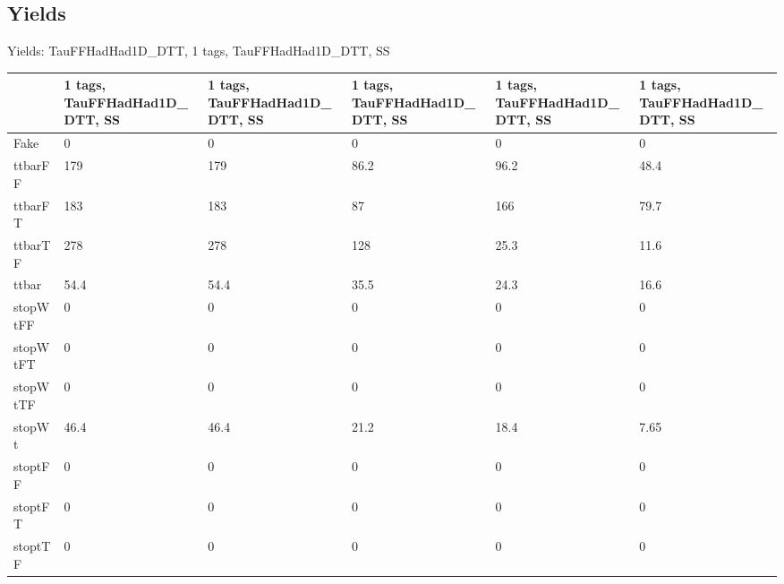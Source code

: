 
\subsection{Yields}

\begin{frame}{Yields: TauFFHadHad1D\_DTT, 1 tags, TauFFHadHad1D\_DTT, SS}
\begin{center}
  \begin{tabular}{l| >{\centering\let\newline\\\arraybackslash\hspace{0pt}}m{1.4cm}| >{\centering\let\newline\\\arraybackslash\hspace{0pt}}m{1.4cm}| >{\centering\let\newline\\\arraybackslash\hspace{0pt}}m{1.4cm}| >{\centering\let\newline\\\arraybackslash\hspace{0pt}}m{1.4cm}| >{\centering\let\newline\\\arraybackslash\hspace{0pt}}m{1.4cm}}
    & 1 tags, TauFFHadHad1D\_DTT, SS & 1 tags, TauFFHadHad1D\_DTT, SS & 1 tags, TauFFHadHad1D\_DTT, SS & 1 tags, TauFFHadHad1D\_DTT, SS & 1 tags, TauFFHadHad1D\_DTT, SS \\
 \hline \hline
    Fake& 0 & 0 & 0 & 0 & 0 \\
 \hline
    ttbarFF& 179 & 179 & 86.2 & 96.2 & 48.4 \\
 \hline
    ttbarFT& 183 & 183 & 87 & 166 & 79.7 \\
 \hline
    ttbarTF& 278 & 278 & 128 & 25.3 & 11.6 \\
 \hline
    ttbar& 54.4 & 54.4 & 35.5 & 24.3 & 16.6 \\
 \hline
    stopWtFF& 0 & 0 & 0 & 0 & 0 \\
 \hline
    stopWtFT& 0 & 0 & 0 & 0 & 0 \\
 \hline
    stopWtTF& 0 & 0 & 0 & 0 & 0 \\
 \hline
    stopWt& 46.4 & 46.4 & 21.2 & 18.4 & 7.65 \\
 \hline
    stoptFF& 0 & 0 & 0 & 0 & 0 \\
 \hline
    stoptFT& 0 & 0 & 0 & 0 & 0 \\
 \hline
    stoptTF& 0 & 0 & 0 & 0 & 0 \\

\end{tabular}
\end{center}
\end{frame}

